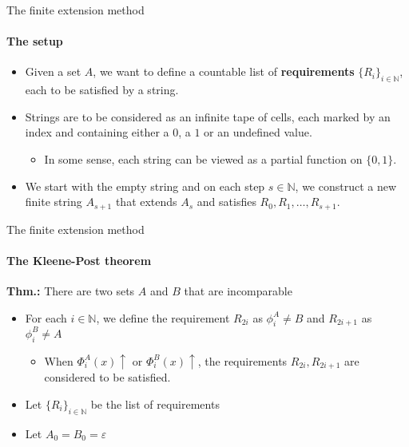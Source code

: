 \documentclass{beamer}
\newcommand{\N}{\mathbb{N}}                     %
\begin{document}
\begin{frame}{The finite extension method}
\framesubtitle{The setup}

    \begin{itemize}[<+->]
        \item Given a set $A$, we want to define a countable list of \textbf{requirements} $\{R_i\}_{i \in \N}$, each to be satisfied by a string.
        
        \item Strings are to be considered as an infinite tape of cells, each marked by an index and containing either a $0$, a $1$ or an undefined value.
        
        \begin{itemize}
            \item In some sense, each string can be viewed as a partial function on $\{0,1\}$.
        \end{itemize}
        
        \item We start with the empty string and on each step $s \in \N$, we construct a new finite string $A_{s+1}$ that extends $A_s$ and satisfies $R_0, R_1, \ldots, R_{s+1}$.
    \end{itemize}
\end{frame}

\begin{frame}{The finite extension method}
\framesubtitle{The Kleene-Post theorem}
    \cite{kleene_post} \textbf{Thm.:} There are two sets $A$ and $B$ that are incomparable
    \begin{itemize}[<+->]
        \item For each $i \in \N$, we define the requirement $R_{2i}$ as $\phi_i^A \neq B$ and $R_{2i+1}$ as $\phi_{i}^B \neq A$
        \begin{itemize}
            \item When $\Phi_i^A(x) \uparrow$ or $\Phi_i^B(x) \uparrow$, the requirements $R_{2i}, R_{2i+1}$ are considered to be satisfied.
        \end{itemize} 
        \item Let $\{R_i\}_{i \in \N}$ be the list of requirements
        \item Let $A_0 = B_0 = \varepsilon$
    \end{itemize}
\end{frame}
\end{document}
